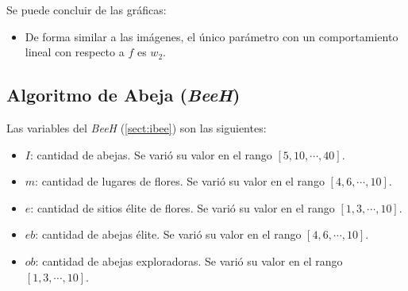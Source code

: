 \begin{figure}[H]
  \centering
  \label{fig:f_sde_csv3}
\end{figure}

	Se puede concluir de las gráficas:
\begin{itemize}
	\item De forma similar a las imágenes, el único parámetro con
un comportamiento lineal con respecto a $f$ es $w_2$.
\end{itemize}

\subsection{Algoritmo de Abeja (\emph{BeeH})}\label{sect:ibee-rv}

    Las variables del \emph{BeeH} (\ref{sect:ibee}) son las siguientes:
\begin{itemize}
    \item $I$: cantidad de abejas. Se varió su valor en el rango
$[5, 10, \cdots, 40]$.
    \item $m$: cantidad de lugares de flores. Se varió su valor en el rango
$[4, 6, \cdots, 10]$.
    \item $e$: cantidad de sitios élite de flores. Se varió su valor en el rango
$[1, 3, \cdots, 10]$.
    \item $eb$: cantidad de abejas élite. Se varió su valor en el rango
$[4, 6, \cdots, 10]$.
	\item $ob$: cantidad de abejas exploradoras. Se varió su valor en el rango
$[1, 3, \cdots, 10]$.
\end{itemize}

